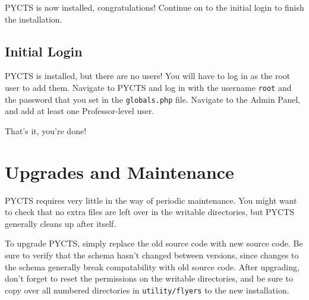 \documentclass[letterpaper,titlepage]{article}
\begin{document}
PYCTS is now installed, congratulations! Continue on to the initial login to finish the installation.

\subsection{Initial Login}
PYCTS is installed, but there are no users! You will have to log in as the root user to add them. Navigate to PYCTS and log in with the username {\tt root} and the password that you set in the {\tt globals.php} file. Navigate to the Admin Panel, and add at least one Professor-level user.

That's it, you're done!

\section{Upgrades and Maintenance}
PYCTS requires very little in the way of periodic maintenance. You might want to check that no extra files are left over in the writable directories, but PYCTS generally cleans up after itself.

To upgrade PYCTS, simply replace the old source code with new source code. Be sure to verify that the schema hasn't changed between versions, since changes to the schema generally break compatability with old source code. After upgrading, don't forget to reset the permissions on the writable directories, and be sure to copy over all numbered directories in {\tt utility/flyers} to the new installation.
\end{document}
